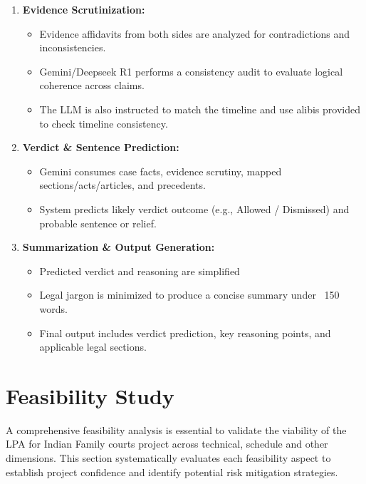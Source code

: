 \begin{enumerate}
	
	
	\item \textbf{Evidence Scrutinization:}
	\begin{itemize}
		\item Evidence affidavits from both sides are analyzed for contradictions and inconsistencies.
		\item Gemini/Deepseek R1 performs a consistency audit to evaluate logical coherence across claims.
		\item The LLM is also instructed to match the timeline and use alibis provided to check timeline consistency.
	\end{itemize}
	
	
	
	\item \textbf{Verdict \& Sentence Prediction:}
	\begin{itemize}
		\item Gemini consumes case facts, evidence scrutiny, mapped sections/acts/articles, and precedents.
		\item System predicts likely verdict outcome (e.g., Allowed / Dismissed) and probable sentence or relief.
	\end{itemize}
	
	
	
	\item \textbf{Summarization \& Output Generation:}
	\begin{itemize}
		\item Predicted verdict and reasoning are simplified
		\item Legal jargon is minimized to produce a concise summary under ~150 words.
		\item Final output includes verdict prediction, key reasoning points, and applicable legal sections.
	\end{itemize}
\end{enumerate}




\newpage
\section{Feasibility Study}

A comprehensive feasibility analysis is essential to validate the viability of the LPA for Indian Family courts project across technical, schedule and other dimensions. This section systematically evaluates each feasibility aspect to establish project confidence and identify potential risk mitigation strategies.

